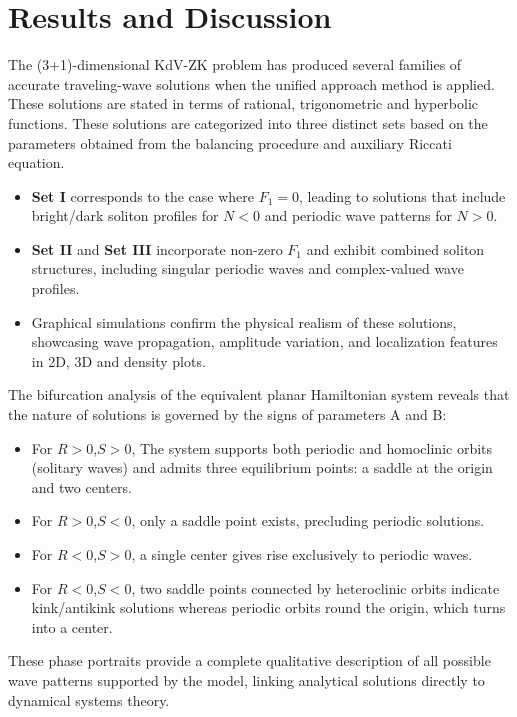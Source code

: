 \documentclass[10pt]{NSP1}
\numberwithin{equation}{section}
\begin{document}
\section{Results and Discussion}\label{s4}
\noindent
The (3+1)-dimensional KdV-ZK problem has produced several families of accurate traveling-wave solutions when the unified approach method is applied. These solutions are stated in terms of rational, trigonometric and hyperbolic functions. These solutions are categorized into three distinct sets based on the parameters obtained from the balancing procedure and auxiliary Riccati equation.\\
\begin{itemize}
  \item \textbf{Set I} corresponds to the case where $F_{1}=0$, leading to solutions that include bright/dark soliton profiles for $N<0$ and periodic wave patterns for $N>0$.
  \item \textbf{Set II} and \textbf{Set III} incorporate non-zero $F_{1}$ and exhibit combined soliton structures, including singular periodic waves and complex-valued wave profiles.
  \item Graphical simulations confirm the physical realism of these solutions, showcasing wave propagation, amplitude variation, and localization features in 2D, 3D and density plots.
\end{itemize}

The bifurcation analysis of the equivalent planar Hamiltonian system reveals that the nature of solutions is governed by the signs of parameters A and B:
\begin{itemize}
  \item For $R>0$,$S>0$, The system supports both periodic and homoclinic orbits (solitary waves) and admits three equilibrium points: a saddle at the origin and two centers.
  \item For $R>0$,$S<0$, only a saddle point exists, precluding periodic solutions.
  \item For $R<0$,$S>0$, a single center gives rise exclusively to periodic waves.
  \item For $R<0$,$S<0$, two saddle points connected by heteroclinic orbits indicate kink/antikink solutions whereas periodic orbits round the origin, which turns into a center.
\end{itemize}
These phase portraits provide a complete qualitative description of all possible wave patterns supported by the model, linking analytical solutions directly to dynamical systems theory.
\end{document}
